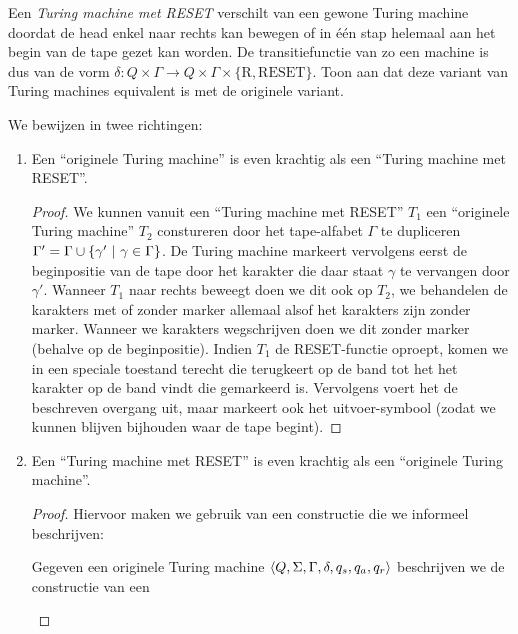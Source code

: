 \documentclass[a4paper]{article}
\begin{document}
\begin{question}
Een \emph{Turing machine met RESET} verschilt van een gewone Turing machine doordat de head enkel naar rechts kan bewegen of in \'e\'en stap helemaal aan het begin van de tape gezet kan worden. De transitiefunctie van zo een machine is dus van de vorm $\delta : Q \times \Gamma \to Q \times \Gamma \times \{ \text{R}, \text{RESET} \}$. Toon aan dat deze variant van Turing machines equivalent is met de originele variant.
\begin{answer}
We bewijzen in twee richtingen:
\begin{enumerate}
\item Een ``originele Turing machine'' is even krachtig als een ``Turing machine met RESET''.
\begin{proof}
We kunnen vanuit een ``Turing machine met RESET'' $T_1$ een ``originele Turing machine'' $T_2$ constureren door het tape-alfabet $\Gamma$ te dupliceren $\Gamma'=\Gamma\cup\left\{ \gamma'\ |\ \gamma\in\Gamma \right\}$. De Turing machine markeert vervolgens eerst de beginpositie van de tape door het karakter die daar staat $\gamma$ te vervangen door $\gamma'$. Wanneer $T_1$ naar rechts beweegt doen we dit ook op $T_2$, we behandelen de karakters met of zonder marker allemaal alsof het karakters zijn zonder marker. Wanneer we karakters wegschrijven doen we dit zonder marker (behalve op de beginpositie). Indien $T_1$ de RESET-functie oproept, komen we in een speciale toestand terecht die terugkeert op de band tot het het karakter op de band vindt die gemarkeerd is. Vervolgens voert het de beschreven overgang uit, maar markeert ook het uitvoer-symbool (zodat we kunnen blijven bijhouden waar de tape begint).
\end{proof}
\item Een ``Turing machine met RESET'' is even krachtig als een ``originele Turing machine''.
\begin{proof}
Hiervoor maken we gebruik van een constructie die we informeel beschrijven:
\begin{construction}
Gegeven een originele Turing machine $\left\langle Q,\Sigma,\Gamma,\delta,q_s,q_a,q_r \right\rangle$ beschrijven we de constructie van een 
\end{construction}
\end{proof}
\end{enumerate}
\end{answer}
\end{question}
\end{document}
